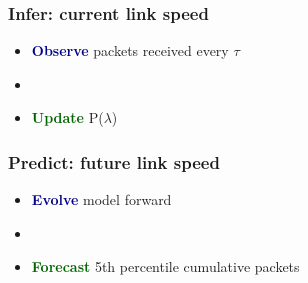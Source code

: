 \documentclass[svgnames]{beamer}
\begin{document}

\begin{frame}
\frametitle{\textbf{Infer}: current link speed}

\Large

\begin{itemize}

\item \textcolor{DarkBlue}{\bf Observe} packets received every $\tau$

\item[]

\item \textcolor{DarkGreen}{\bf Update} P($\lambda$)

\end{itemize}

\end{frame}

\begin{frame}
\frametitle{\textbf{Predict}: future link speed}

\Large

\begin{itemize}
\item \textcolor{DarkBlue}{\bf Evolve} model forward

\item[]

\item \textcolor{DarkGreen}{\bf Forecast} 5th percentile cumulative packets


\end{itemize}

\end{frame}
\end{document}
